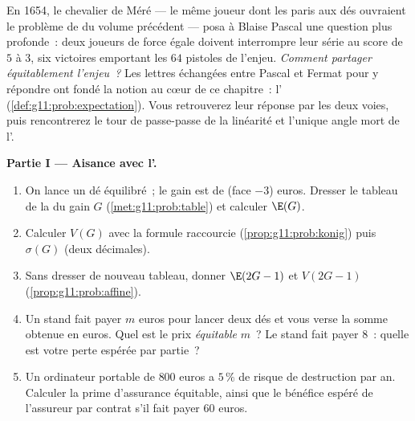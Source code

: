 \begin{problem}
\label{pb:g11:prob:1}
En 1654, le chevalier de Méré --- le même joueur dont les paris aux
dés ouvraient le problème de  du volume précédent ---
posa à Blaise Pascal une question plus profonde~: deux joueurs de
force égale doivent interrompre leur série au score de $5$ à $3$,
six victoires emportant les $64$ pistoles de l'enjeu. \emph{Comment
partager équitablement l'enjeu~?} Les lettres échangées entre Pascal
et Fermat pour y répondre ont fondé la notion au cœur de ce
chapitre~: l' (\cref{def:g11:prob:expectation}). Vous
retrouverez leur réponse par les deux voies, puis rencontrerez le
tour de passe-passe de la linéarité et l'unique angle mort de
l'.

\medskip
\noindent\textbf{Partie I --- Aisance avec l'.}
\begin{enumerate}
  \item On lance un dé équilibré~; le gain est de (face $- 3$)
        euros. Dresser le tableau de la  du gain $G$
        (\cref{met:g11:prob:table}) et calculer $\E(G)$.
  \item Calculer $V(G)$ avec la formule raccourcie
        (\cref{prop:g11:prob:konig}) puis $\sigma(G)$ (deux
        décimales).
  \item Sans dresser de nouveau tableau, donner $\E(2G - 1)$ et
        $V(2G - 1)$ (\cref{prop:g11:prob:affine}).
  \item Un stand fait payer $m$ euros pour lancer deux dés et vous
        verse la somme obtenue en euros. Quel est le prix
        \emph{équitable} $m$~? Le stand fait payer $8$~: quelle est
        votre perte espérée par partie~?
  \item Un ordinateur portable de $800$ euros a $5\,\%$ de risque
        de destruction par an. Calculer la prime d'assurance
        équitable, ainsi que le bénéfice espéré de l'assureur par
        contrat s'il fait payer $60$ euros.
\end{enumerate}


\end{problem}
